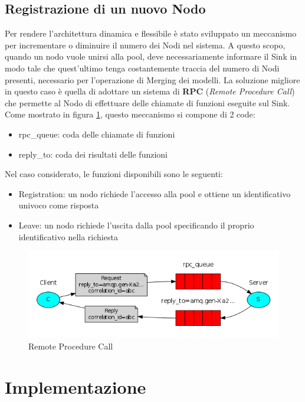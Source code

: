     \subsection{Registrazione di un nuovo Nodo}
      Per rendere l'architettura dinamica e flessibile è stato sviluppato un meccanismo per incrementare o diminuire il numero dei Nodi nel sistema. A questo scopo, quando un nodo vuole unirsi alla pool, deve necessariamente informare il Sink in modo tale che quest'ultimo tenga costantemente traccia del numero di Nodi presenti, necessario per l'operazione di Merging dei modelli. \newline
      La soluzione migliore in questo caso è quella di adottare un sistema di \textbf{RPC} (\textit{Remote Procedure Call}) che permette al Nodo di effettuare delle chiamate di funzioni eseguite sul Sink. Come mostrato in figura \ref{fig:RPC}, questo meccanismo si compone di 2 code:
      \begin{itemize}
        \item rpc\_queue: coda delle chiamate di funzioni
        \item reply\_to: coda dei risultati delle funzioni
      \end{itemize}
      Nel caso considerato, le funzioni disponibili sono le seguenti:
      \begin{itemize}
        \item Registration: un nodo richiede l'accesso alla pool e ottiene un identificativo univoco come risposta
        \item Leave: un nodo richiede l'uscita dalla pool specificando il proprio identificativo nella richiesta
      \end{itemize}
      \begin{figure}[h!]
        \centering
        \includegraphics[scale=0.7]{../Immagini/RPC.png}
        \caption{Remote Procedure Call}
        \label{fig:RPC}
      \end{figure}


  \section{Implementazione}
